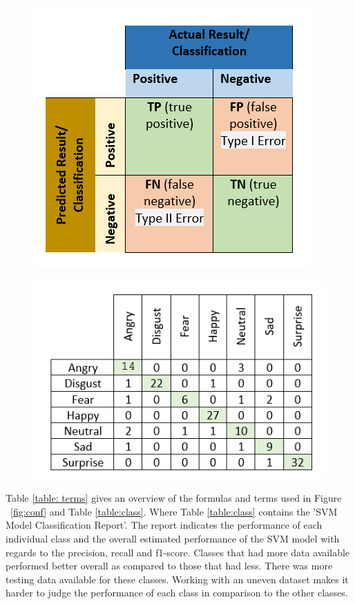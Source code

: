 \begin{itemize}
\begin{figure}[H]
\centering
\begin{minipage}{.5\textwidth}
  \centering
  \includegraphics[width=.9\linewidth]{conf}
  \label{fig:conf}
\end{minipage}%
\begin{minipage}{.5\textwidth}
  \centering
  \includegraphics[width=.9\linewidth]{conf1}
  \label{fig:conf1}
\end{minipage}
\end{figure}

Table \ref{table: terms} gives an overview of the formulas and terms used in Figure ~\ref{fig:conf} and Table \ref{table:class}. Where Table \ref{table:class} contains the 'SVM Model Classification Report'. The report indicates the performance of each individual class and the overall estimated performance of the SVM model with regards to the precision, recall and f1-score. Classes that had more data available performed better overall as compared to those that had less. There was more testing data available for these classes. Working with an uneven dataset makes it harder to judge the performance of each class in comparison to the other classes. 


\end{itemize}
